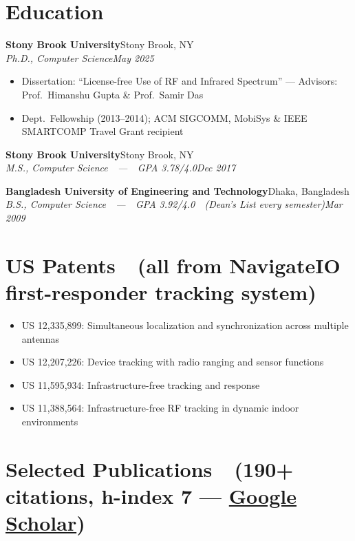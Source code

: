 \documentclass[10.5pt,letterpaper]{article}
\newcommand{\entrytitle}[2]{%
  \textbf{#1}\hfill #2%
}
\newcommand{\entrysub}[2]{%
  \textit{#1}\hfill \textit{#2}%
}
\begin{document}
\section{Education}

\entrytitle{Stony Brook University}{Stony Brook, NY}\\
\entrysub{Ph.D., Computer Science}{May 2025}
\begin{itemize}
  \item Dissertation: ``License-free Use of RF and Infrared Spectrum'' ---
        Advisors: Prof.\ Himanshu Gupta \& Prof.\ Samir Das
  \item Dept.\ Fellowship (2013--2014); ACM SIGCOMM, MobiSys \& IEEE SMARTCOMP Travel Grant recipient
\end{itemize}

\vspace{4pt}
\entrytitle{Stony Brook University}{Stony Brook, NY}\\
\entrysub{M.S., Computer Science\ \ ---\ \ GPA 3.78/4.0}{Dec 2017}

\vspace{4pt}
\entrytitle{Bangladesh University of Engineering and Technology}{Dhaka, Bangladesh}\\
\entrysub{B.S., Computer Science\ \ ---\ \ GPA 3.92/4.0\ \ (Dean's List every semester)}{Mar 2009}

\section{US Patents\ \ {\normalfont\small(all from NavigateIO first-responder tracking system)}}

\begin{itemize}
  \item US 12,335,899: Simultaneous localization and synchronization across multiple antennas
  \item US 12,207,226: Device tracking with radio ranging and sensor functions
  \item US 11,595,934: Infrastructure-free tracking and response
  \item US 11,388,564: Infrastructure-free RF tracking in dynamic indoor environments
\end{itemize}

\section{Selected Publications\ \ {\normalfont\small(190+ citations, h-index 7 ---
  \href{https://scholar.google.com/citations?user=H0kYswEAAAAJ}{Google Scholar})}}
\end{document}

